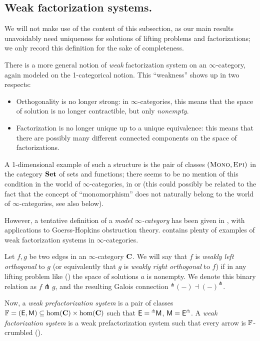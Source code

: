\subsection{Weak factorization systems.}
We will not make use of the content of this subsection, as our main results unavoidably need uniqueness for solutions of lifting problems and factorizations; we only record this definition for the sake of completeness.

There is a more general notion of \emph{weak} factorization system on an $\infty$\hyp{}category, again modeled on the 1\hyp{}categorical notion. This ``weakness'' shows up in two respects:
\begin{itemize}
\item Orthogonality is no longer strong: in $\infty$\hyp{}categories, this means that the space of solution is no longer contractible, but only \emph{nonempty}.
\item Factorization is no longer unique up to a unique equivalence: this means that there are possibly many different connected components on the space of factorizations.
\end{itemize}
A 1\hyp{}dimensional example of such a structure is the pair of classes $(\text{\scshape Mono}, \text{\scshape Epi})$ in the category $\mathbf{Set}$ of sets and functions; there seems to be no mention of this condition in the world of $\infty$\hyp{}categories, in \cite{HTT} or \cite{Joy} (this could possibly be related to the fact that the concept of ``monomorphism'' does not naturally belong to the world of $\infty$\hyp{}categories, see also  below).

However, a tentative definition of a \emph{model $\infty$\hyp{}category} has been given in \cite{Aaron}, with applications to Goerss\hyp{}Hopkins obstruction theory. \cite[\S\textbf{2}]{Aaron} contains plenty of examples of weak factorization systems in $\infty$\hyp{}categories.
\begin{definition}\label{weak.ortho}
Let $f,g$ be two edges in an $\infty$\hyp{}category $\mathbf{C}$. We will say that $f$ is \emph{weakly left orthogonal} to $g$ (or equivalently that $g$ is \emph{weakly right orthogonal} to $f$) if in any lifting problem like ()
the space of solutions $a$ is nonempty. We denote this binary relation as $f\pitchfork g$, and the resulting Galois connection ${}^\pitchfork(-)\dashv (-)^\pitchfork$.
\end{definition}
Now, a \emph{weak prefactorization system} is a pair of classes $\mathbb{F} = (\mathsf{E},\mathsf{M})\subseteq \text{hom}(\mathbf{C})\times \text{hom}(\mathbf{C})$ such that $\mathsf{E} = {}^\pitchfork\mathsf{M}$, $\mathsf{M} = \mathsf{E}^\pitchfork$. A \emph{weak factorization system} is a weak prefactorization system such that every arrow is $\mathbb{F}$\hyp{}crumbled (\adef {}).

